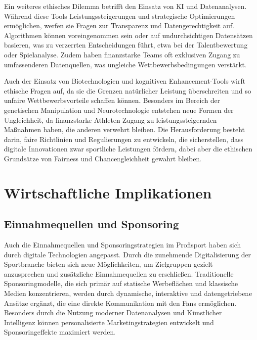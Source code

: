 \documentclass[
  number]{elsarticle}
\begin{document}
Ein weiteres ethisches Dilemma betrifft den Einsatz von KI und
Datenanalysen. Während diese Tools Leistungssteigerungen und
strategische Optimierungen ermöglichen, werfen sie Fragen zur
Transparenz und Datengerechtigkeit auf. Algorithmen können
voreingenommen sein oder auf undurchsichtigen Datensätzen basieren, was
zu verzerrten Entscheidungen führt, etwa bei der Talentbewertung oder
Spielanalyse. Zudem haben finanzstarke Teams oft exklusiven Zugang zu
umfassenderen Datenquellen, was ungleiche Wettbewerbsbedingungen
verstärkt. \citep[p.~4]{laukyte_disruptivetech}

Auch der Einsatz von Biotechnologien und kognitiven Enhancement-Tools
wirft ethische Fragen auf, da sie die Grenzen natürlicher Leistung
überschreiten und so unfaire Wettbewerbsvorteile schaffen können.
Besonders im Bereich der genetischen Manipulation und Neurotechnologie
entstehen neue Formen der Ungleichheit, da finanzstarke Athleten Zugang
zu leistungssteigernden Maßnahmen haben, die anderen verwehrt bleiben.
Die Herausforderung besteht darin, faire Richtlinien und Regulierungen
zu entwickeln, die sicherstellen, dass digitale Innovationen zwar
sportliche Leistungen fördern, dabei aber die ethischen Grundsätze von
Fairness und Chancengleichheit gewahrt bleiben.
\citep[pp.~4,11-12]{laukyte_disruptivetech}

\section{Wirtschaftliche
Implikationen}\label{wirtschaftliche-implikationen}

\subsection{Einnahmequellen und
Sponsoring}\label{einnahmequellen-und-sponsoring}

Auch die Einnahmequellen und Sponsoringstrategien im Profisport haben
sich durch digitale Technologien angepasst. Durch die zunehmende
Digitalisierung der Sportbranche bieten sich neue Möglichkeiten, um
Zielgruppen gezielt anzusprechen und zusätzliche Einnahmequellen zu
erschließen. Traditionelle Sponsoringmodelle, die sich primär auf
statische Werbeflächen und klassische Medien konzentrieren, werden durch
dynamische, interaktive und datengetriebene Ansätze ergänzt, die eine
direkte Kommunikation mit den Fans ermöglichen. Besonders durch die
Nutzung moderner Datenanalysen und Künstlicher Intelligenz können
personalisierte Marketingstrategien entwickelt und Sponsoringeffekte
maximiert werden. \citep[pp.~15-16]{Schüler_Bandenwerbung}
\end{document}
